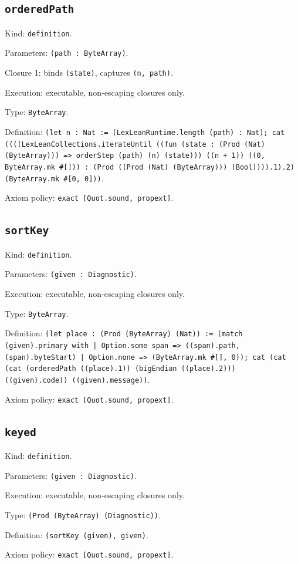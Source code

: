 \documentclass[11pt]{article}
\begin{document}
\subsection*{\texttt{orderedPath}}
\noindent Kind: \texttt{definition}.\par
\noindent Parameters: \texttt{(path : ByteArray)}.\par
\noindent Closure 1: binds \texttt{(state)}, captures \texttt{(n, path)}.\par
\noindent Execution: executable, non-escaping closures only.\par
\noindent Type: \texttt{ByteArray}.\par
\noindent Definition: \texttt{(let n : Nat := (LexLeanRuntime.length (path) : Nat); cat ((((LexLeanCollections.iterateUntil ((fun (state : (Prod (Nat) (ByteArray))) => orderStep (path) (n) (state))) ((n + 1)) ((0, ByteArray.mk \#[])) : (Prod ((Prod (Nat) (ByteArray))) (Bool)))).1).2) (ByteArray.mk \#[0, 0]))}.\par
\noindent Axiom policy: \texttt{exact [Quot.sound, propext]}.\par
\subsection*{\texttt{sortKey}}
\noindent Kind: \texttt{definition}.\par
\noindent Parameters: \texttt{(given : Diagnostic)}.\par
\noindent Execution: executable, non-escaping closures only.\par
\noindent Type: \texttt{ByteArray}.\par
\noindent Definition: \texttt{(let place : (Prod (ByteArray) (Nat)) := (match (given).primary with | Option.some span => ((span).path, (span).byteStart) | Option.none => (ByteArray.mk \#[], 0)); cat (cat (cat (orderedPath ((place).1)) (bigEndian ((place).2))) ((given).code)) ((given).message))}.\par
\noindent Axiom policy: \texttt{exact [Quot.sound, propext]}.\par
\subsection*{\texttt{keyed}}
\noindent Kind: \texttt{definition}.\par
\noindent Parameters: \texttt{(given : Diagnostic)}.\par
\noindent Execution: executable, non-escaping closures only.\par
\noindent Type: \texttt{(Prod (ByteArray) (Diagnostic))}.\par
\noindent Definition: \texttt{(sortKey (given), given)}.\par
\noindent Axiom policy: \texttt{exact [Quot.sound, propext]}.\par
\end{document}
